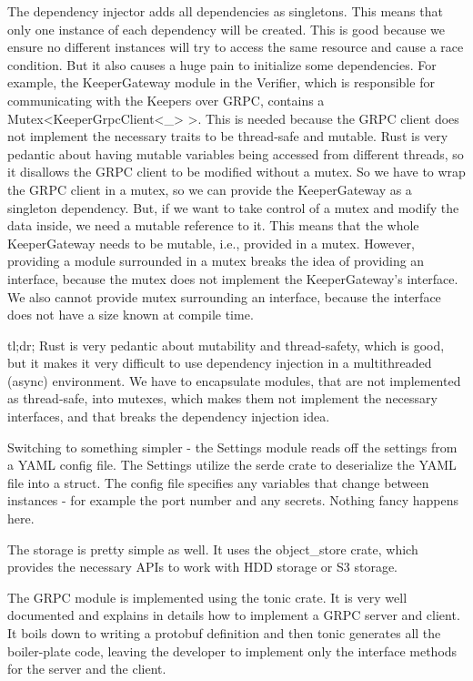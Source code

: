 \documentclass[ twoside,openright,titlepage,numbers=noenddot,headinclude,%
                footinclude=true,cleardoublepage=empty,abstractoff, %
                BCOR=5mm,paper=a4,fontsize=11pt,%
                ngerman,american,%
                ]{scrreprt}
\begin{document}
The dependency injector adds all dependencies as singletons.
This means that only one instance of each dependency will be created.
This is good because we ensure no different instances will try to access the same resource and cause a race condition.
But it also causes a huge pain to initialize some dependencies.
For example, the KeeperGateway module in the Verifier,
which is responsible for communicating with the Keepers over GRPC,
contains a Mutex<KeeperGrpcClient<\_> >.
This is needed because the GRPC client does not implement the necessary traits to be thread-safe and mutable.
Rust is very pedantic about having mutable variables being accessed from different threads,
so it disallows the GRPC client to be modified without a mutex.
So we have to wrap the GRPC client in a mutex, so we can provide the KeeperGateway as a singleton dependency.
But, if we want to take control of a mutex and modify the data inside, we need a mutable reference to it.
This means that the whole KeeperGateway needs to be mutable, i.e., provided in a mutex.
However, providing a module surrounded in a mutex breaks the idea of providing an interface,
because the mutex does not implement the KeeperGateway's interface.
We also cannot provide mutex surrounding an interface,
because the interface does not have a size known at compile time.

tl;dr; Rust is very pedantic about mutability and thread-safety,
which is good, but it makes it very difficult to use dependency injection in a multithreaded (async) environment.
We have to encapsulate modules, that are not implemented as thread-safe, into mutexes,
which makes them not implement the necessary interfaces, and that breaks the dependency injection idea.

Switching to something simpler - the Settings module reads off the settings from a YAML config file.
The Settings utilize the serde crate to deserialize the YAML file into a struct.
The config file specifies any variables that change between instances - for example the port number and any secrets.
Nothing fancy happens here.

The storage is pretty simple as well.
It uses the object\_store crate, which provides the necessary APIs to work with HDD storage or S3 storage.

The GRPC module is implemented using the tonic crate.
It is very well documented and explains in details how to implement a GRPC server and client.
It boils down to writing a protobuf definition and then tonic generates all the boiler-plate code,
leaving the developer to implement only the interface methods for the server and the client.
\end{document}
